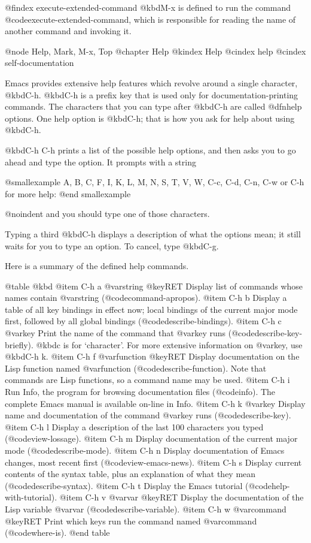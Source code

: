 {{{{{{@findex execute-extended-command
  @kbd{M-x} is defined to run the command @code{execute-extended-command},
which is responsible for reading the name of another command and invoking
it.

@node Help, Mark, M-x, Top
@chapter Help
@kindex Help
@cindex help
@cindex self-documentation

  Emacs provides extensive help features which revolve around a single
character, @kbd{C-h}.  @kbd{C-h} is a prefix key that is used only for
documentation-printing commands.  The characters that you can type after
@kbd{C-h} are called @dfn{help options}.  One help option is @kbd{C-h};
that is how you ask for help about using @kbd{C-h}.

  @kbd{C-h C-h} prints a list of the possible help options, and then asks
you to go ahead and type the option.  It prompts with a string

@smallexample
A, B, C, F, I, K, L, M, N, S, T, V, W, C-c, C-d, C-n, C-w or C-h for more help: 
@end smallexample

@noindent
and you should type one of those characters.

  Typing a third @kbd{C-h} displays a description of what the options mean;
it still waits for you to type an option.  To cancel, type @kbd{C-g}.

  Here is a summary of the defined help commands.

@table @kbd
@item C-h a @var{string} @key{RET}
Display list of commands whose names contain @var{string}
(@code{command-apropos}).
@item C-h b
Display a table of all key bindings in effect now; local bindings of
the current major mode first, followed by all global bindings
(@code{describe-bindings}).
@item C-h c @var{key}
Print the name of the command that @var{key} runs (@code{describe-key-briefly}).
@kbd{c} is for `character'.  For more extensive information on @var{key},
use @kbd{C-h k}.
@item C-h f @var{function} @key{RET}
Display documentation on the Lisp function named @var{function}
(@code{describe-function}).  Note that commands are Lisp functions, so
a command name may be used.
@item C-h i
Run Info, the program for browsing documentation files (@code{info}).
The complete Emacs manual is available on-line in Info.
@item C-h k @var{key}
Display name and documentation of the command @var{key} runs (@code{describe-key}).
@item C-h l
Display a description of the last 100 characters you typed
(@code{view-lossage}).
@item C-h m
Display documentation of the current major mode (@code{describe-mode}).
@item C-h n
Display documentation of Emacs changes, most recent first
(@code{view-emacs-news}).
@item C-h s
Display current contents of the syntax table, plus an explanation of
what they mean (@code{describe-syntax}).
@item C-h t
Display the Emacs tutorial (@code{help-with-tutorial}).
@item C-h v @var{var} @key{RET}
Display the documentation of the Lisp variable @var{var}
(@code{describe-variable}).
@item C-h w @var{command} @key{RET}
Print which keys run the command named @var{command} (@code{where-is}).
@end table

}}}}}}
